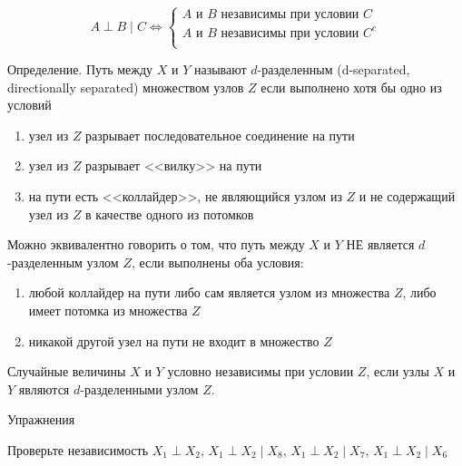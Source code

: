 \begin{equation}
A \perp B \mid C \Leftrightarrow 
\begin{cases}
A \mbox{ и } B \mbox{ независимы при условии } C \\
A \mbox{ и } B \mbox{ независимы при условии } C^c \\
\end{cases}
\end{equation}


Определение. Путь между $X$ и $Y$ называют $d$-разделенным (d-separated, directionally separated) множеством узлов $Z$ если выполнено хотя бы одно из условий
\begin{enumerate}
\item узел из $Z$ разрывает последовательное соединение на пути
\item узел из $Z$ разрывает <<вилку>> на пути
\item на пути есть <<коллайдер>>, не являющийся узлом из $Z$ и не содержащий узел из $Z$ в качестве одного из потомков
\end{enumerate}


Можно эквивалентно говорить о том, что путь между $X$ и $Y$ НЕ является $d$-разделенным узлом $Z$, если выполнены оба условия:
\begin{enumerate}
\item любой коллайдер на пути либо сам является узлом из множества $Z$, либо имеет потомка из множества $Z$
\item никакой другой узел на пути не входит в множество $Z$
\end{enumerate}


Случайные величины $X$ и $Y$ условно независимы при условии $Z$, если узлы $X$ и $Y$ являются $d$-разделенными узлом $Z$.


Упражнения

Проверьте независимость $X_1 \perp X_2$, $X_1 \perp X_2 \mid X_8$, $X_1 \perp X_2 \mid X_7$, $X_1 \perp X_2 \mid X_6$

